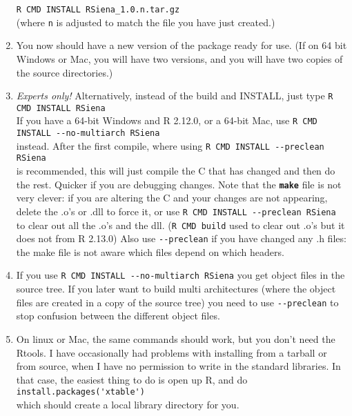 \documentclass[12pt, a4paper]{article}
\renewcommand{\=}{\,=\,}
\newcommand{\+}{\,+\,}
\newcommand{\sfn}[1]{\textbf{\texttt{#1}}}
\begin{document}
\begin{enumerate}
\verb|R CMD INSTALL RSiena_1.0.n.tar.gz|\\
(where \verb|n| is adjusted to match the file you have just created.)
\item You now should have a new version of the package ready for use. (If on 64
  bit Windows or Mac, you will have two versions, and you will have two copies
  of the source directories.)
\item \emph{Experts only!} Alternatively, instead of the build and INSTALL, just
  type
  \verb|R CMD INSTALL RSiena|\\
  If you have a 64-bit Windows and R 2.12.0, or a 64-bit Mac, use
  \verb|R CMD INSTALL --no-multiarch RSiena|\\
  instead. After the first compile, where using
  \verb|R CMD INSTALL --preclean RSiena| \\is recommended, this will just
  compile the C that has changed and then do the rest.  Quicker if you are
  debugging changes. Note that the \sfn{make} file is not very clever: if you
  are altering the C and your changes are not appearing, delete the .o's or .dll
  to force it, or use
  \verb|R CMD INSTALL --preclean RSiena|\\
  to clear out all the .o's and the dll. (\verb|R CMD build| used to clear out
  .o's but it does not from R 2.13.0) Also use \verb|--preclean| if you have
  changed any .h files: the make file is not aware which files depend on which
  headers.
\item If you use \verb|R CMD INSTALL --no-multiarch RSiena|
you get object files in the source tree. If you later want to build multi
architectures (where the object files are created in a copy of the source tree)
you need to use \verb|--preclean| to stop confusion between the different object
files.
\item On linux or Mac, the same commands should work, but you don't need the
  Rtools. I have occasionally had problems with installing from a tarball or
  from source, when I have no permission to write in the standard libraries. In
  that case, the easiest thing to do is
  open up R, and do \\
\verb|install.packages('xtable')| \\which should create a
  local library directory for you.
\end{enumerate}
\end{document}
